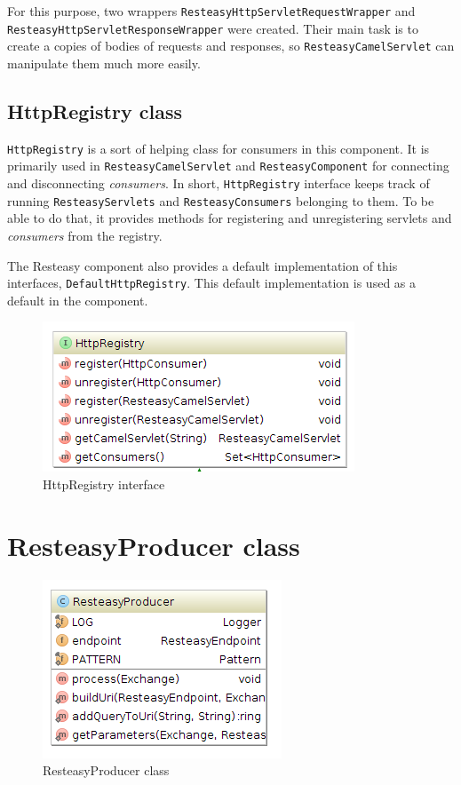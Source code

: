 \documentclass[12pt,final,oneside]{fithesis2}
\begin{document}
For this purpose, two wrappers \texttt{ResteasyHttpServletRequestWrap\-per} and \texttt{ResteasyHttpServletResponseWrapper} were created. Their main task is to create a copies of bodies of requests and responses, so  \texttt{ResteasyCamelServlet} can manipulate them much more easily.





\subsection{HttpRegistry class}\label{registry}
\texttt{HttpRegistry} is a sort of helping class for consumers in this component. It is primarily used in \texttt{ResteasyCamelServlet} and \texttt{ResteasyComponent} for connecting and disconnecting \textit{consumers}. In short, \texttt{HttpRegistry} interface keeps track of running \texttt{ResteasyServlets} and \texttt{ResteasyConsu\-mers} belonging to them.  To be able to do that, it provides methods for registering and unregistering servlets and \textit{consumers} from the registry.

The Resteasy component also provides a default implementation of this interfaces, \texttt{DefaultHttpRegistry}. This default implementation is used as a default in the component. 

\begin{figure}[!h]
\centering
\includegraphics[width=0.8\linewidth]{images/registry.png}
\caption{HttpRegistry interface}
\label{comp}
\end{figure}


\section{ResteasyProducer class}\label{producer}
\begin{figure}[h]
\centering
\includegraphics[width=0.6\linewidth]{images/producer.png}
\caption{ResteasyProducer class}
\label{comp}
\end{figure}
\end{document}
